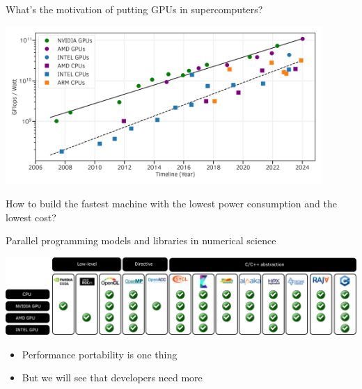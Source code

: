 \documentclass[aspectratio=169]{beamer}
\begin{document}
\begin{frame}{What's the motivation of putting GPUs in supercomputers?}
    \begin{center}
        \includegraphics[width=0.9\textwidth]{flop_watt_ratio_history_fp64.png}
    \end{center}

     How to build the fastest machine with the lowest power consumption and the lowest cost?
\end{frame}


\begin{frame}{Parallel programming models and libraries in numerical science}
    \begin{center}
        \includegraphics[width=\textwidth]{prog_model.png}
    \end{center}
    \begin{itemize}
        \item Performance portability is one thing
        \item But we will see that developers need more
    \end{itemize}
\end{frame}

\end{document}
